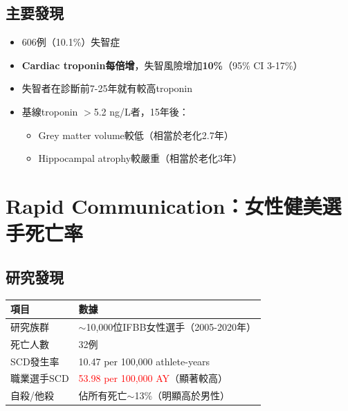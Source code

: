 \documentclass[12pt,a4paper]{article}
\begin{document}
\subsection{主要發現}

\begin{itemize}
    \item 606例（10.1\%）失智症
    \item \textbf{Cardiac troponin每倍增}，失智風險增加\textbf{10\%}（95\% CI 3-17\%）
    \item 失智者在診斷前7-25年就有較高troponin
    \item 基線troponin $>$5.2 ng/L者，15年後：
    \begin{itemize}
        \item Grey matter volume較低（相當於老化2.7年）
        \item Hippocampal atrophy較嚴重（相當於老化3年）
    \end{itemize}
\end{itemize}


\section{Rapid Communication：女性健美選手死亡率}

\subsection{研究發現}

\begin{longtable}{p{5cm}p{9cm}}
\toprule
\textbf{項目} & \textbf{數據} \\
\midrule
\endfirsthead
\bottomrule
\endfoot

研究族群 & $\sim$10,000位IFBB女性選手（2005-2020年） \\
\midrule
死亡人數 & 32例 \\
\midrule
SCD發生率 & 10.47 per 100,000 athlete-years \\
\midrule
職業選手SCD & \textcolor{red}{53.98 per 100,000 AY}（顯著較高） \\
\midrule
自殺/他殺 & 佔所有死亡$\sim$13\%（明顯高於男性） \\
\bottomrule
\end{longtable}
\end{document}
